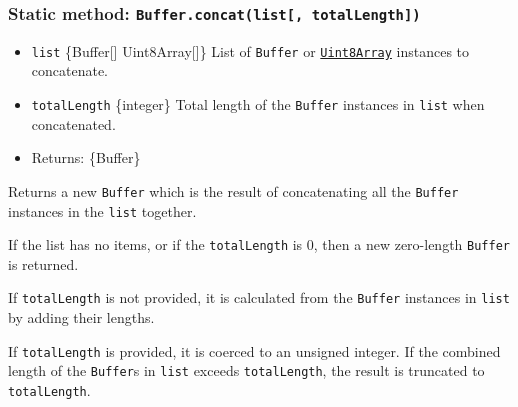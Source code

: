 \subsubsection{\texorpdfstring{Static method:
\texttt{Buffer.concat(list{[},\ totalLength{]})}}{Static method: Buffer.concat(list{[}, totalLength{]})}}\label{static-method-buffer.concatlist-totallength}

\begin{itemize}
\tightlist
\item
  \texttt{list} \{Buffer{[}{]} \textbar{} Uint8Array{[}{]}\} List of
  \texttt{Buffer} or
  \href{https://developer.mozilla.org/en-US/docs/Web/JavaScript/Reference/Global_Objects/Uint8Array}{\texttt{Uint8Array}}
  instances to concatenate.
\item
  \texttt{totalLength} \{integer\} Total length of the \texttt{Buffer}
  instances in \texttt{list} when concatenated.
\item
  Returns: \{Buffer\}
\end{itemize}

Returns a new \texttt{Buffer} which is the result of concatenating all
the \texttt{Buffer} instances in the \texttt{list} together.

If the list has no items, or if the \texttt{totalLength} is 0, then a
new zero-length \texttt{Buffer} is returned.

If \texttt{totalLength} is not provided, it is calculated from the
\texttt{Buffer} instances in \texttt{list} by adding their lengths.

If \texttt{totalLength} is provided, it is coerced to an unsigned
integer. If the combined length of the \texttt{Buffer}s in \texttt{list}
exceeds \texttt{totalLength}, the result is truncated to
\texttt{totalLength}.

